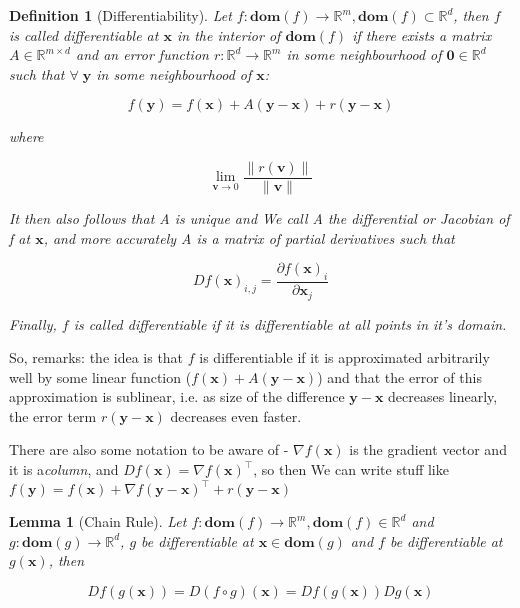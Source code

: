 \documentclass{article}
\newtheorem{definition}[theorem]{Definition}
\newtheorem{lemma}[theorem]{Lemma}
\begin{document}
		\begin{definition}[Differentiability]
			Let $f:\mathbf{dom}(f)\to\mathbb{R}^m, \mathbf{dom}(f)\subset\mathbb{R}^d$, then $f$ is called \textnormal{differentiable} at $\mathbf{x}$ in the interior of $\mathbf{dom}(f)$ if there exists a matrix $A\in\mathbb{R}^{m\times d}$ and an error function $r:\mathbb{R}^d\to\mathbb{R}^m$ in some neighbourhood of $\mathbf{0}\in\mathbb{R}^d$ such that $\forall\;\mathbf{y}$ in some neighbourhood of $\mathbf{x}$:
			
			\[f(\mathbf{y}) = f(\mathbf{x}) + A(\mathbf{y-x}) + r(\mathbf{y-x}) \]
			
			where
			
			\[ \lim_{\mathbf{v}\to 0} \frac{\|r(\mathbf{v})\|}{\|\mathbf{v}\|} \]
			
			It then also follows that A is unique and We call A the \textnormal{differential} or \textnormal{Jacobian} of f at $\mathbf{x}$, and more accurately A is a matrix of partial derivatives such that
			
			\[ Df(\mathbf{x})_{i, j} = \frac{\partial f(\mathbf{x})_i}{\partial \mathbf{x}_j} \]
			
			Finally, $f$ is called \textnormal{differentiable} if it is differentiable at all points in it's domain. 
		\end{definition}
		
		So, remarks: the idea is that $f$ is differentiable if it is approximated arbitrarily well by some linear function ($f(\mathbf{x}) + A(\mathbf{y-x})$) and that the error of this approximation is sublinear, i.e. as size of the difference $\mathbf{y-x}$ decreases linearly, the error term $r(\mathbf{y-x})$ decreases even faster.
		
		There are also some notation to be aware of - $\nabla f(\mathbf{x})$ is the gradient vector and it is a\textit{column}, and $Df(\mathbf{x}) = \nabla f(\mathbf{x})^\top$, so then We can write stuff like $f(\mathbf{y}) = f(\mathbf{x}) + \nabla f(\mathbf{y-x})^\top + r(\mathbf{y-x})$
		
		\begin{lemma}[Chain Rule]
			Let $f:\mathbf{dom}(f)\to\mathbb{R}^m,\mathbf{dom}(f)\in\mathbb{R}^d$ and  $g:\mathbf{dom}(g)\to\mathbb{R}^d$, $g$ be differentiable at $\mathbf{x}\in\mathbf{dom}(g)$ and $f$ be differentiable at $g(\mathbf{x})$, then
			
			\[Df(g(\mathbf{x})) = D(f\circ g)(\mathbf{x}) = Df(g(\mathbf{x}))Dg(\mathbf{x}) \]
		\end{lemma}
		
\end{document}
